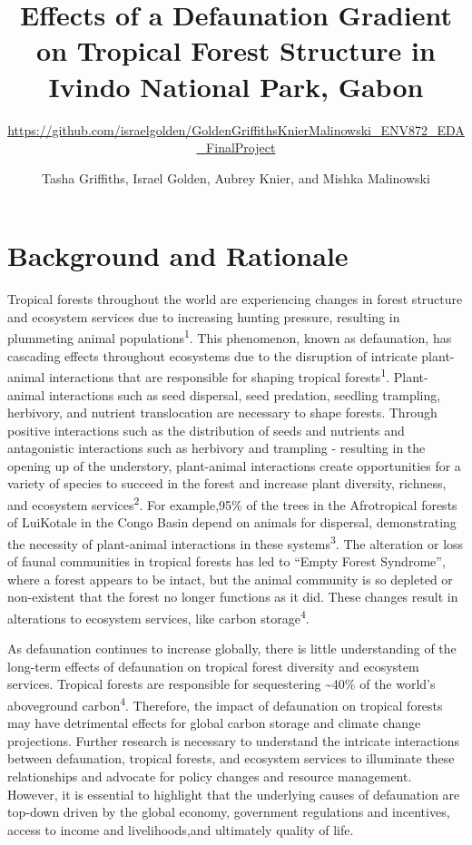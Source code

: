 \documentclass[
  12pt,
]{article}
\title{Effects of a Defaunation Gradient on Tropical Forest Structure in Ivindo
National Park, Gabon}
\subtitle{\url{https://github.com/israelgolden/GoldenGriffithsKnierMalinowski_ENV872_EDA_FinalProject}}
\author{Tasha Griffiths, Israel Golden, Aubrey Knier, and Mishka Malinowski}
\date{}
\begin{document}
\maketitle

\newpage
\tableofcontents 
\newpage
\listoftables 
\newpage
\listoffigures 
\newpage

\hypertarget{background-and-rationale}{%
\section{\texorpdfstring{\textbf{Background and
Rationale}}{Background and Rationale}}\label{background-and-rationale}}

Tropical forests throughout the world are experiencing changes in forest
structure and ecosystem services due to increasing hunting pressure,
resulting in plummeting animal populations\textsuperscript{1}. This
phenomenon, known as defaunation, has cascading effects throughout
ecosystems due to the disruption of intricate plant-animal interactions
that are responsible for shaping tropical forests\textsuperscript{1}.
Plant-animal interactions such as seed dispersal, seed predation,
seedling trampling, herbivory, and nutrient translocation are necessary
to shape forests. Through positive interactions such as the distribution
of seeds and nutrients and antagonistic interactions such as herbivory
and trampling - resulting in the opening up of the understory,
plant-animal interactions create opportunities for a variety of species
to succeed in the forest and increase plant diversity, richness, and
ecosystem services\textsuperscript{2}. For example,95\% of the trees in
the Afrotropical forests of LuiKotale in the Congo Basin depend on
animals for dispersal, demonstrating the necessity of plant-animal
interactions in these systems\textsuperscript{3}. The alteration or loss
of faunal communities in tropical forests has led to ``Empty Forest
Syndrome'', where a forest appears to be intact, but the animal
community is so depleted or non-existent that the forest no longer
functions as it did. These changes result in alterations to ecosystem
services, like carbon storage\textsuperscript{4}.

As defaunation continues to increase globally, there is little
understanding of the long-term effects of defaunation on tropical forest
diversity and ecosystem services. Tropical forests are responsible for
sequestering \textasciitilde40\% of the world's aboveground
carbon\textsuperscript{4}. Therefore, the impact of defaunation on
tropical forests may have detrimental effects for global carbon storage
and climate change projections. Further research is necessary to
understand the intricate interactions between defaunation, tropical
forests, and ecosystem services to illuminate these relationships and
advocate for policy changes and resource management. However, it is
essential to highlight that the underlying causes of defaunation are
top-down driven by the global economy, government regulations and
incentives, access to income and livelihoods,and ultimately quality of
life.
\end{document}
